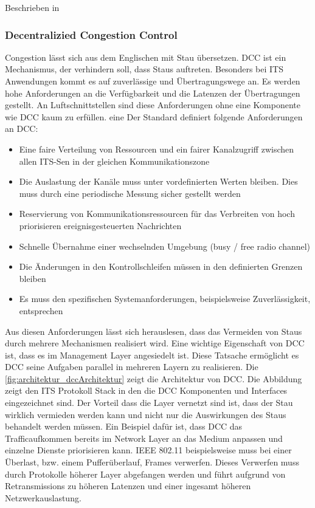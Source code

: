 Beschrieben in \cite{etsi102723-2}

\subsubsection{Decentralizied Congestion Control\label{architektur_dcc}}
Congestion lässt sich aus dem Englischen mit Stau übersetzen. \ac{DCC} ist ein Mechanismus, der verhindern soll, dass Staus auftreten. Besonders bei \ac{ITS} Anwendungen kommt es auf zuverlässige und Übertragungswege an. Es werden hohe Anforderungen an die Verfügbarkeit und die Latenzen der Übertragungen gestellt. An Luftschnittstellen sind diese Anforderungen ohne eine Komponente wie \ac{DCC} kaum zu erfüllen. eine Der Standard \cite{etsi102687} definiert folgende Anforderungen an \ac{DCC}:
\begin{itemize}
	\item Eine faire Verteilung von Ressourcen und ein fairer Kanalzugriff zwischen allen \ac{ITS-S}en in der gleichen Kommunikationszone
	\item Die Auslastung der Kanäle muss unter vordefinierten Werten bleiben. Dies muss durch eine periodische Messung sicher gestellt werden
	\item Reservierung von Kommunikationsressourcen für das Verbreiten von hoch priorisieren ereignisgesteuerten Nachrichten
	\item Schnelle Übernahme einer wechselnden Umgebung (busy / free radio channel)
	\item Die Änderungen in den Kontrollschleifen müssen in den definierten Grenzen bleiben
	\item Es muss den spezifischen Systemanforderungen, beispielsweise Zuverlässigkeit, entsprechen
\end{itemize}

Aus diesen Anforderungen lässt sich herauslesen, dass das Vermeiden von Staus durch mehrere Mechanismen realisiert wird. Eine wichtige Eigenschaft von \ac{DCC} ist, dass es im Management Layer angesiedelt ist. Diese Tatsache ermöglicht es \ac{DCC} seine Aufgaben parallel in mehreren Layern zu realisieren. Die \ref{fig:architektur_dccArchitektur} zeigt die Architektur von \ac{DCC}. Die Abbildung zeigt den \ac{ITS} Protokoll Stack in den die \ac{DCC} Komponenten und Interfaces eingezeichnet sind. Der Vorteil dass die Layer vernetzt sind ist, dass der Stau wirklich vermieden werden kann und nicht nur die Auswirkungen des Staus behandelt werden müssen. Ein Beispiel dafür ist, dass \ac{DCC} das Trafficaufkommen bereits im Network Layer an das Medium anpassen und einzelne Dienste priorisieren kann. IEEE 802.11 beispielsweise muss bei einer Überlast, bzw. einem Pufferüberlauf, Frames verwerfen. Dieses Verwerfen muss durch Protokolle höherer Layer abgefangen werden und führt aufgrund von Retransmissions zu höheren Latenzen und einer ingesamt höheren Netzwerkauslastung. 

